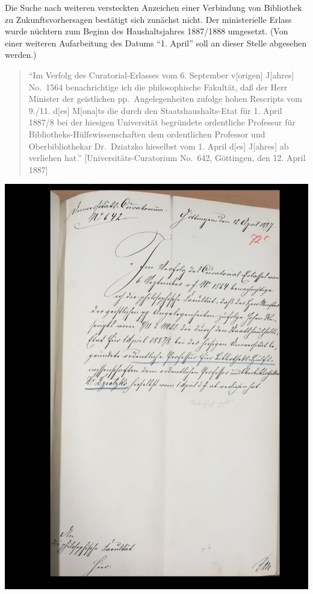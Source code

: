 \documentclass[a4paper,
fontsize=11pt,
oneside,
numbers=noperiodatend,
parskip=half-,
bibliography=totoc,
final
]{scrartcl}
\begin{document}
Die Suche nach weiteren versteckten Anzeichen einer Verbindung von
Bibliothek zu Zukunftsvorhersagen bestätigt sich zunächst nicht. Der
ministerielle Erlass wurde nüchtern zum Beginn des Haushaltsjahres
1887/1888 umgesetzt. (Von einer weiteren Aufarbeitung des Datums
\enquote{1. April} soll an dieser Stelle abgesehen werden.)

\begin{quote}
\enquote{Im Verfolg des Curatorial-Erlasses vom 6. September
v{[}origen{]} J{[}ahres{]} No.~1564 benachrichtige ich die
philosophische Fakultät, daß der Herr Minister der geistlichen
pp.~Angelegenheiten zufolge hohen Rescripts vom 9./11. d{[}es{]}
M{[}ona{]}ts die durch den Staatshaushalts-Etat für 1. April 1887/8 bei
der hiesigen Universität begründete ordentliche Professur für
Bibliotheks-Hülfswissenschaften dem ordentlichen Professor und
Oberbibliothekar Dr.~Dziatzko hieselbst vom 1. April d{[}es{]}
J{[}ahres{]} ab verliehen hat.} {[}Universitäts-Curatorium No.~642,
Göttingen, den 12. April 1887{]}
\end{quote}

\begin{center}
\includegraphics{img/image3.jpg}
\end{center}
\end{document}
